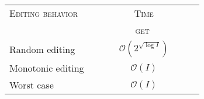 \begin{tabularx}{0.455\textwidth}{@{}Xc@{}}
  \toprule
  \textsc{Editing behavior} & \textsc{Time} \\
  & \ \ \ \ \ \ \ \ \ \textsc{get} \ \ \ \ \ \ \ \ \ \\ \midrule
  Random editing & $\mathcal{O}(2^{\sqrt{\log I}})$ \\
  Monotonic editing & $\mathcal{O}(I)$ \\
  Worst case & $\mathcal{O}(I)$ \\ \bottomrule
\end{tabularx}